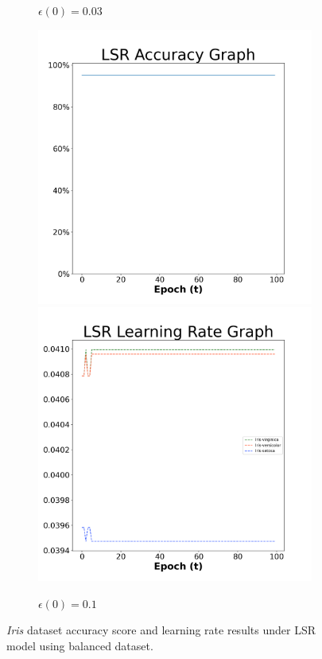 \begin{figure}[H]
\begin{subfigure}{0.3\textwidth}
  \caption{$\epsilon(0)=0.03$}
\end{subfigure}\hfil %
\begin{subfigure}{0.3\textwidth}
  \includegraphics[width=\linewidth]{images/exper1/iris/LSR_0.1_acc.png}
  \includegraphics[width=\linewidth]{images/exper1/iris/LSR_0.1_lr.png}
  \caption{$\epsilon(0)=0.1$}
\end{subfigure}

\caption{\textit{Iris} dataset accuracy score and learning rate results under LSR model using balanced dataset.}
\end{figure}


